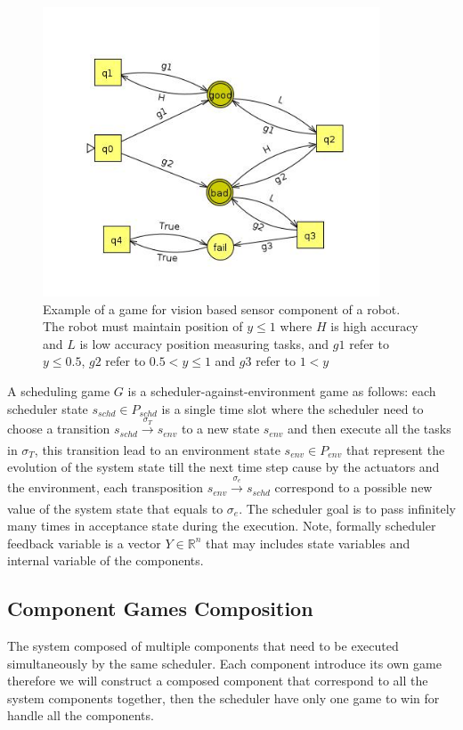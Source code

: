 \documentclass[ twoside, 12pt ]{article}
\newcommand\R{{\mathbb R}}
\begin{document}
\begin{figure} %
    \centerline{\includegraphics[width=100mm]{gameExample.jpg}}
    \caption{Example of a game for vision based sensor component of a robot.
        The robot must maintain position of $y \le 1$ where $H$ is high accuracy and $L$ is low accuracy position measuring tasks, and
        $g1$ refer to $y \le 0.5$, $g2$ refer to $0.5 < y \le 1$ and $g3$ refer to $1 < y$ }
    \label{fig:exampleGame}
\end{figure}

A scheduling game $G$ is a scheduler-against-environment game as follows: each scheduler state $s_{schd} \in P_{schd}$ is a single time slot where the scheduler need to choose a transition $s_{schd} \xrightarrow[]{\sigma_{T}} s_{env}$ to a new state $s_{env}$ and then execute all the tasks in $\sigma_{T}$, this transition lead to an environment state $s_{env} \in P_{env}$ that represent the evolution of the system state till the next time step cause by the actuators and the environment, each transposition $s_{env} \xrightarrow[]{\sigma_{e}} s_{schd}$ correspond to a possible new value of the system state that equals to $\sigma_{e}$.
The scheduler goal is to pass infinitely many times in acceptance state during the execution.
Note, formally scheduler feedback variable is a vector $Y \in \R^n$ that may includes state variables and internal variable of the components.

\subsection{Component Games Composition}
The system composed of multiple components that need to be executed simultaneously by the same scheduler.
Each component introduce its own game therefore we will construct a composed component that correspond to all the system components together, then the scheduler have only one game to win for handle all the components.
\end{document}
